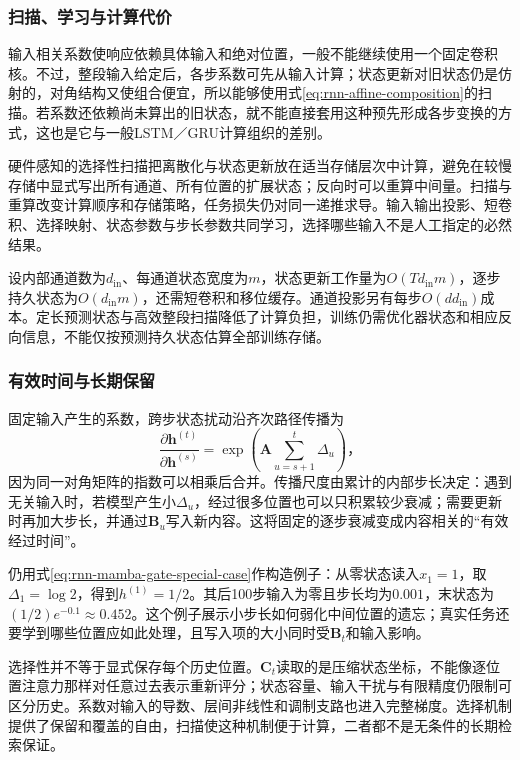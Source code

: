 \subsubsection{扫描、学习与计算代价}
\label{sec:rnn-mamba-scan}

输入相关系数使响应依赖具体输入和绝对位置，一般不能继续使用一个固定卷积核。不过，整段输入给定后，各步系数可先从输入计算；状态更新对旧状态仍是仿射的，对角结构又使组合便宜，所以能够使用式\eqref{eq:rnn-affine-composition}的扫描。若系数还依赖尚未算出的旧状态，就不能直接套用这种预先形成各步变换的方式，这也是它与一般LSTM／GRU计算组织的差别。

硬件感知的选择性扫描把离散化与状态更新放在适当存储层次中计算，避免在较慢存储中显式写出所有通道、所有位置的扩展状态；反向时可以重算中间量。扫描与重算改变计算顺序和存储策略，任务损失仍对同一递推求导。输入输出投影、短卷积、选择映射、状态参数与步长参数共同学习，选择哪些输入不是人工指定的必然结果。

设内部通道数为$d_{\mathrm{in}}$、每通道状态宽度为$m$，状态更新工作量为$O(Td_{\mathrm{in}}m)$，逐步持久状态为$O(d_{\mathrm{in}}m)$，还需短卷积和移位缓存。通道投影另有每步$O(dd_{\mathrm{in}})$成本。定长预测状态与高效整段扫描降低了计算负担，训练仍需优化器状态和相应反向信息，不能仅按预测持久状态估算全部训练存储。

\subsubsection{有效时间与长期保留}
\label{sec:rnn-mamba-long-memory}

固定输入产生的系数，跨步状态扰动沿齐次路径传播为
\begin{equation}
  \frac{\partial\bm h^{(t)}}{\partial\bm h^{(s)}}
    =\exp\!\left(\bm A\sum_{u=s+1}^{t}\Delta_u\right)\text{，}
  \label{eq:rnn-mamba-memory-product}
\end{equation}
因为同一对角矩阵的指数可以相乘后合并。传播尺度由累计的内部步长决定：遇到无关输入时，若模型产生小$\Delta_u$，经过很多位置也可以只积累较少衰减；需要更新时再加大步长，并通过$\bm B_u$写入新内容。这将固定的逐步衰减变成内容相关的“有效经过时间”。

仍用式\eqref{eq:rnn-mamba-gate-special-case}作构造例子：从零状态读入$x_1=1$，取$\Delta_1=\log2$，得到$h^{(1)}=1/2$。其后100步输入为零且步长均为$0.001$，末状态为$(1/2)e^{-0.1}\approx0.452$。这个例子展示小步长如何弱化中间位置的遗忘；真实任务还要学到哪些位置应如此处理，且写入项的大小同时受$\bm B_t$和输入影响。

选择性并不等于显式保存每个历史位置。$\bm C_t$读取的是压缩状态坐标，不能像逐位置注意力那样对任意过去表示重新评分；状态容量、输入干扰与有限精度仍限制可区分历史。系数对输入的导数、层间非线性和调制支路也进入完整梯度。选择机制提供了保留和覆盖的自由，扫描使这种机制便于计算，二者都不是无条件的长期检索保证。

